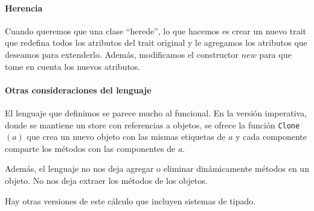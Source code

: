 \paragraph{Herencia} Cuando queremos que una clase ``herede'', lo que hacemos es crear un nuevo trait que redefina todos los atributos del trait original y le agregamos los atributos que deseamos para extenderlo. Además, modificamos el constructor $new$ para que tome en cuenta los nuevos atributos.

\paragraph{Otras consideraciones del lenguaje}
El lenguaje que definimos se parece mucho al funcional. En la versión imperativa, donde se mantiene un store con referencias a objetos, se ofrece la función \texttt{Clone}$(a)$ que crea un nuevo objeto con las mismas etiquetas de $a$ y cada componente comparte los métodos con las componentes de $a$.

Además, el lenguaje no nos deja agregar o eliminar dinámicamente métodos en un objeto. No nos deja extraer los métodos de los objetos.

Hay otras versiones de este cálculo que incluyen sistemas de tipado.